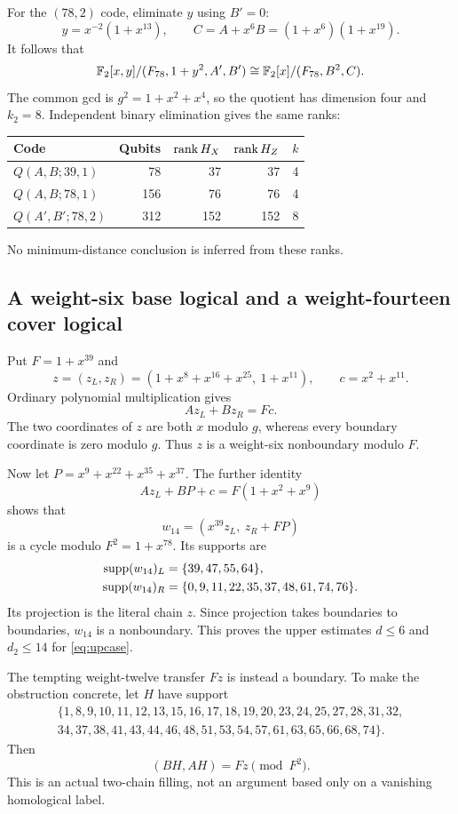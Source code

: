 For the $(78,2)$ code, eliminate $y$ using $B'=0$:
\[
 y=x^{-2}(1+x^{13}),\qquad
 C=A+x^6B=(1+x^6)(1+x^{19}).
\]
It follows that
\[
 \mathbb F_2[x,y]/(F_{78},1+y^2,A',B')
 \cong\mathbb F_2[x]/(F_{78},B^2,C).
\]
The common gcd is $g^2=1+x^2+x^4$, so the quotient has dimension four and $k_2=8$. Independent binary elimination gives the same ranks:
\begin{center}
\begin{tabular}{lrrrr}
\toprule
Code & Qubits & $\operatorname{rank} H_X$ & $\operatorname{rank} H_Z$ & $k$\\
\midrule
$Q(A,B;39,1)$ & 78 & 37 & 37 & 4\\
$Q(A,B;78,1)$ & 156 & 76 & 76 & 4\\
$Q(A',B';78,2)$ & 312 & 152 & 152 & 8\\
\bottomrule
\end{tabular}
\end{center}
No minimum-distance conclusion is inferred from these ranks.

\subsection{A weight-six base logical and a weight-fourteen cover logical}
Put $F=1+x^{39}$ and
\[
 z=(z_L,z_R)=(1+x^8+x^{16}+x^{25},\ 1+x^{11}),\qquad c=x^2+x^{11}.
\]
Ordinary polynomial multiplication gives
\begin{equation}\label{eq:zsyndrome}
 Az_L+Bz_R=Fc.
\end{equation}
The two coordinates of $z$ are both $x$ modulo $g$, whereas every boundary coordinate is zero modulo $g$. Thus $z$ is a weight-six nonboundary modulo $F$.

Now let $P=x^9+x^{22}+x^{35}+x^{37}$. The further identity
\[
 Az_L+BP+c=F(1+x^2+x^9)
\]
shows that
\begin{equation}\label{eq:w14}
 w_{14}=(x^{39}z_L,\ z_R+FP)
\end{equation}
is a cycle modulo $F^2=1+x^{78}$. Its supports are
\begin{align*}
 \operatorname{supp} (w_{14})_L&=\{39,47,55,64\},\\
 \operatorname{supp} (w_{14})_R&=\{0,9,11,22,35,37,48,61,74,76\}.
\end{align*}
Its projection is the literal chain $z$. Since projection takes boundaries to boundaries, $w_{14}$ is a nonboundary. This proves the upper estimates $d\le6$ and $d_2\le14$ for \eqref{eq:upcase}.

The tempting weight-twelve transfer $Fz$ is instead a boundary. To make the obstruction concrete, let $H$ have support
\begin{multline*}
\{1,8,9,10,11,12,13,15,16,17,18,19,20,23,24,25,27,28,31,32,\\
34,37,38,41,43,44,46,48,51,53,54,57,61,63,65,66,68,74\}.
\end{multline*}
Then
\begin{equation}\label{eq:transfer-boundary}
 (BH,AH)=Fz\pmod{F^2}.
\end{equation}
This is an actual two-chain filling, not an argument based only on a vanishing homological label.

